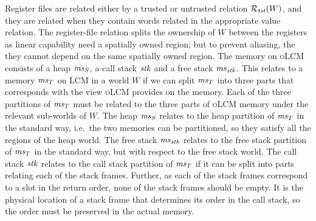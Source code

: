 \documentclass[acmsmall,review,anonymous]{acmart}\settopmatter{printfolios=true,printccs=false,printacmref=false}
\newcommand{\trgcm}{\textsc{LCM}}
\newcommand{\srccm}{\textsc{oLCM}}
\begin{document}
Register files are related either by a trusted or untrusted relation $\mathcal{R}_{\mathit{tst}}(W)$, and they are related when they contain words related in the appropriate value relation.
The register-file relation splits the ownership of $W$ between the registers as linear capability need a spatially owned region; but to prevent aliasing, the they cannot depend on the same spatially owned region.
The memory on \srccm{} consists of a heap $\mathit{ms}_S$, a call stack $\mathit{stk}$ and a free stack $\mathit{ms}_{\mathit{stk}}$.
This relates to a memory $\mathit{ms}_T$ on \trgcm{} in a world $W$ if we can split $\mathit{ms}_T$ into three parts that corresponds with the view \srccm{} provides on the memory.
Each of the three partitions of $\mathit{ms}_T$ must be related to the three parts of \srccm{} memory under the relevant sub-worlds of $W$.
The heap $\mathit{ms}_S$ relates to the heap partition of $\mathit{ms}_T$ in the standard way, i.e.\ the two memories can be partitioned, so they satisfy all the regions of the heap world.
The free stack $\mathit{ms}_{\mathit{stk}}$ relates to the free stack partition of $\mathit{ms}_T$ in the standard way, but with respect to the free stack world.
The call stack $\mathit{stk}$ relates to the call stack partition of $\mathit{ms}_T$ if it can be split into parts relating each of the stack frames.
Further, as each of the stack frames correspond to a slot in the return order, none of the stack frames should be empty.
It is the physical location of a stack frame that determines its order in the call stack, so the order must be preserved in the actual memory.
\end{document}
